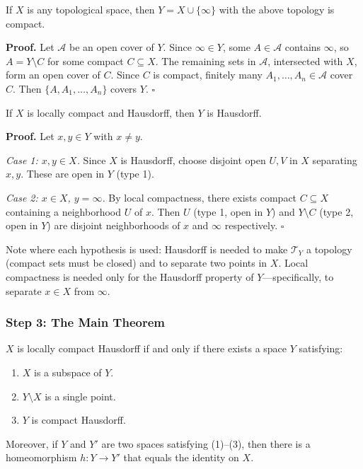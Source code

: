 \documentclass[11pt]{report}
\renewenvironment{proof}[1][Proof]{\noindent\textbf{#1.} }{\hfill$\square$\par\vspace{5pt}}
\begin{document}
\begin{propbox}[$Y$ is Compact]
If $X$ is any topological space, then $Y = X \cup \{\infty\}$ with the above topology is compact.
\end{propbox}

\begin{proof}
Let $\mathcal{A}$ be an open cover of $Y$. Since $\infty \in Y$, some $A \in \mathcal{A}$ contains $\infty$, so $A = Y \setminus C$ for some compact $C \subseteq X$. The remaining sets in $\mathcal{A}$, intersected with $X$, form an open cover of $C$. Since $C$ is compact, finitely many $A_1, \ldots, A_n \in \mathcal{A}$ cover $C$. Then $\{A, A_1, \ldots, A_n\}$ covers $Y$.
\end{proof}

\begin{propbox}
If $X$ is locally compact and Hausdorff, then $Y$ is Hausdorff.
\end{propbox}

\begin{proof}
Let $x, y \in Y$ with $x \neq y$.

\textit{Case 1: $x, y \in X$.} Since $X$ is Hausdorff, choose disjoint open $U, V$ in $X$ separating $x, y$. These are open in $Y$ (type 1). \checkmark

\textit{Case 2: $x \in X$, $y = \infty$.} By local compactness, there exists compact $C \subseteq X$ containing a neighborhood $U$ of $x$. Then $U$ (type 1, open in $Y$) and $Y \setminus C$ (type 2, open in $Y$) are disjoint neighborhoods of $x$ and $\infty$ respectively. \checkmark
\end{proof}

\begin{rembox}
Note where each hypothesis is used: Hausdorff is needed to make $\mathcal{T}_Y$ a topology (compact sets must be closed) and to separate two points in $X$. Local compactness is needed only for the Hausdorff property of $Y$---specifically, to separate $x \in X$ from $\infty$.
\end{rembox}

\subsubsection*{Step 3: The Main Theorem}

\begin{thmbox}
$X$ is locally compact Hausdorff if and only if there exists a space $Y$ satisfying:
\begin{enumerate}
    \item $X$ is a subspace of $Y$.
    \item $Y \setminus X$ is a single point.
    \item $Y$ is compact Hausdorff.
\end{enumerate}
Moreover, if $Y$ and $Y'$ are two spaces satisfying (1)--(3), then there is a homeomorphism $h: Y \to Y'$ that equals the identity on $X$.
\end{thmbox}
\end{document}
